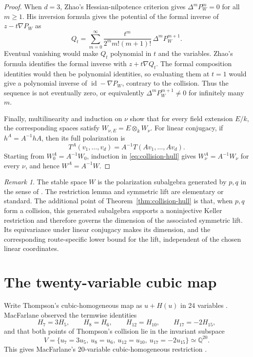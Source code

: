\documentclass[11pt]{article}
\theoremstyle{remark}
\newtheorem{remark}[theorem]{Remark}
\newcommand{\Q}{\mathbb{Q}}
\newcommand{\id}{\operatorname{id}}
\begin{document}
\begin{proof}
When $d=3$, Zhao's Hessian-nilpotence criterion \citep[Theorem~4.3]{Zhao2007} gives $\Delta^mP_W^m=0$ for all $m\ge1$. His inversion formula \citep[Theorem~3.4]{Zhao2007} gives the potential of the formal inverse of $z-t\nabla P_W$ as
\begin{equation}\label{eq:zhao-inverse}
Q_t=\sum_{m=0}^{\infty}\frac{t^m}{2^m m!(m+1)!}\,\Delta^mP_W^{m+1}.
\end{equation}
Eventual vanishing would make $Q_t$ polynomial in $t$ and the variables. Zhao's formula identifies the formal inverse with $z+t\nabla Q_t$. The formal composition identities would then be polynomial identities, so evaluating them at $t=1$ would give a polynomial inverse of $\id-\nabla P_W$, contrary to the collision. Thus the sequence is not eventually zero, or equivalently $\Delta^mP_W^{m+1}\ne0$ for infinitely many $m$.

Finally, multilinearity and induction on $\nu$ show that for every field extension $E/k$, the corresponding spaces satisfy $W_{\nu,E}=E\otimes_kW_\nu$. For linear conjugacy, if $h^A=A^{-1}hA$, then its full polarization is
\[
T^A(v_1,\ldots,v_d)=A^{-1}T(Av_1,\ldots,Av_d).
\]
Starting from $W^A_0=A^{-1}W_0$, induction in \eqref{eq:collision-hull} gives $W^A_\nu=A^{-1}W_\nu$ for every $\nu$, and hence $W^A=A^{-1}W$.
\end{proof}

\begin{remark}\label{rem:carrier}
The stable space $W$ is the polarization subalgebra generated by $p,q$ in the sense of \citet{Umirbaev2019}. The restriction lemma and symmetric lift are elementary or standard. The additional point of Theorem~\ref{thm:collision-hull} is that, when $p,q$ form a collision, this generated subalgebra supports a noninjective Keller restriction and therefore governs the dimension of the associated symmetric lift. Its equivariance under linear conjugacy makes its dimension, and the corresponding route-specific lower bound for the lift, independent of the chosen linear coordinates.
\end{remark}

\section{The twenty-variable cubic map}\label{sec:twenty}

Write Thompson's cubic-homogeneous map as $u+H(u)$ in 24 variables \citep{Thompson2026}. MacFarlane observed the termwise identities
\begin{equation}\label{eq:four-relations}
H_7=3H_5,\qquad H_8=H_6,\qquad H_{12}=H_{10},\qquad H_{17}=-2H_{15},
\end{equation}
and that both points of Thompson's collision lie in the invariant subspace
\begin{equation}\label{eq:V}
V=\{u_7=3u_5,\ u_8=u_6,\ u_{12}=u_{10},\ u_{17}=-2u_{15}\}\simeq\Q^{20}.
\end{equation}
This gives MacFarlane's 20-variable cubic-homogeneous restriction \citep{MacFarlane2026}.
\end{document}
